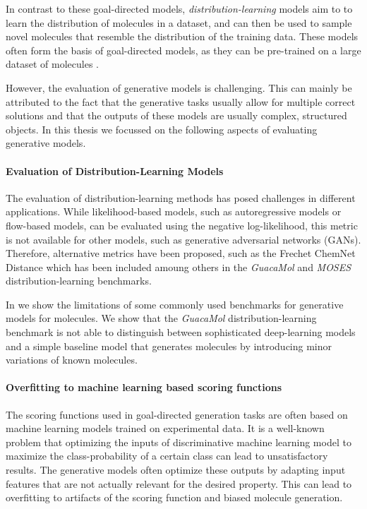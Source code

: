 In contrast to these goal-directed models, \emph{distribution-learning} models aim to 
to learn the distribution of molecules in a dataset, and can then be used to 
sample novel molecules that resemble the distribution of the training data.
These models often form the basis of goal-directed models, as they can be pre-trained on a large
dataset of molecules \citep{segler,reinvent}. 

However, the evaluation of generative models is challenging. This can mainly be attributed to
the fact that the generative tasks usually allow for multiple correct solutions and 
that the outputs of these models are usually complex, structured objects. 
In this thesis we focussed on the following aspects of evaluating generative models.

\paragraph{Evaluation of Distribution-Learning Models} The evaluation of distribution-learning
methods has posed challenges in different applications. While likelihood-based models, such as 
autoregressive models or flow-based models, can be evaluated using the negative log-likelihood, 
this metric is not available for other models, such as generative adversarial networks (GANs).
Therefore, alternative metrics have been proposed, such as the Frechet ChemNet Distance \citep{preuerFrechetChemNetDistance2018}
which has been included amoung others in the \emph{GuacaMol} \citep{brownGuacaMolBenchmarkingModels2019}
and \emph{MOSES} \citep{polykovskiyMolecularSets2018} distribution-learning benchmarks.

In \citep{renzFailureModesMolecule2019} we show the limitations of some commonly
used benchmarks for generative models for molecules. We show that the
\emph{GuacaMol} distribution-learning benchmark
\citep{brownGuacaMolBenchmarkingModels2019} is not able to distinguish between
sophisticated deep-learning models and a simple baseline model that generates
molecules by introducing minor variations of known molecules. 

\paragraph{Overfitting to machine learning based scoring functions} 
The scoring functions used in goal-directed generation tasks are often based on
machine learning models trained on experimental data. It is a well-known problem
that optimizing the inputs of discriminative machine learning model 
to maximize the class-probability of a certain class can lead to unsatisfactory results.
The generative models often optimize these outputs by adapting input features that 
are not actually relevant for the desired property. This can lead to overfitting to
artifacts of the scoring function and biased molecule generation.


